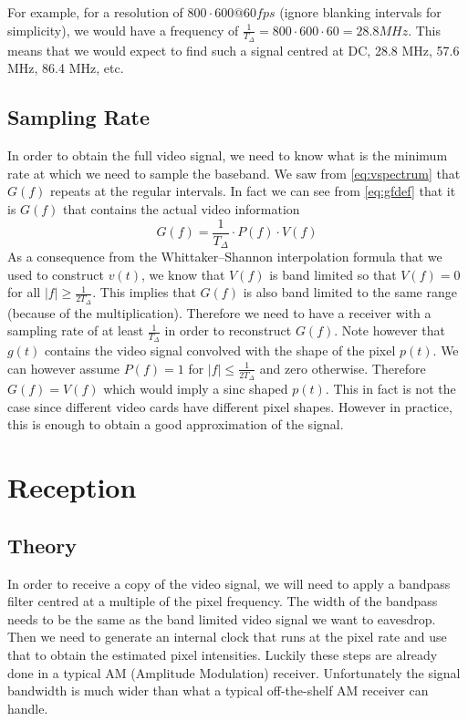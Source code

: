 \documentclass[a4paper,12pt,twoside,openright]{report}
\begin{document}
For example, for a resolution of $800 \cdot 600 @ 60fps$ (ignore blanking intervals for simplicity), we would have a frequency of $\frac{1}{T_{\Delta}} = 800 \cdot 600 \cdot 60 = 28.8 MHz$. This means that we would expect to find such a signal centred at DC, 28.8 MHz, 57.6 MHz, 86.4 MHz, etc.

\subsection{Sampling Rate}

In order to obtain the full video signal, we need to know what is the minimum rate at which we need to sample the baseband. We saw from \ref{eq:vspectrum} that $G(f)$ repeats at the regular intervals. In fact we can see from \ref{eq:gfdef} that it is $G(f)$ that contains the actual video information
$$G(f) = \frac{1}{T_{\Delta}} \cdot P(f) \cdot V(f)$$
As a consequence from the Whittaker--Shannon interpolation formula that we used to construct $v(t)$, we know that $V(f)$ is band limited so that $V(f) = 0$ for all $|f| \geq \frac{1}{2 T_{\Delta}}$. This implies that $G(f)$ is also band limited to the same range (because of the multiplication). Therefore we need to have a receiver with a sampling rate of at least $\frac{1}{T_{\Delta}}$ in order to reconstruct $G(f)$. Note however that $g(t)$ contains the video signal convolved with the shape of the pixel $p(t)$. We can however assume $P(f)=1$ for $|f| \le \frac{1}{2 T_{\Delta}}$ and zero otherwise. Therefore $G(f) = V(f)$ which would imply a sinc shaped $p(t)$. This in fact is not the case since different video cards have different pixel shapes\cite{kuhn2003compromising}. However in practice, this is enough to obtain a good approximation of the signal.

\section{Reception}

\subsection{Theory}
In order to receive a copy of the video signal, we will need to apply a bandpass filter centred at a multiple of the pixel frequency. The width of the bandpass needs to be the same as the band limited video signal we want to eavesdrop. Then we need to generate an internal clock that runs at the pixel rate and use that to obtain the estimated pixel intensities. Luckily these steps are already done in a typical AM (Amplitude Modulation) receiver. Unfortunately the signal bandwidth is much wider than what a typical off-the-shelf AM receiver can handle.
\end{document}
